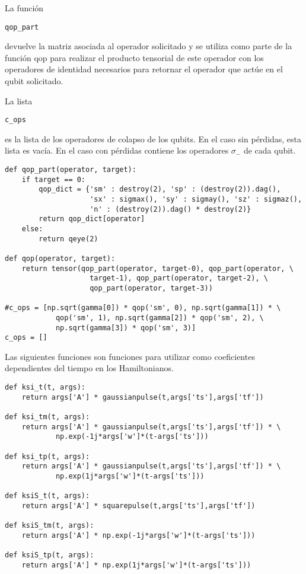 La función \begin{verbatim}qop_part\end{verbatim} devuelve la matriz asociada al operador solicitado y se utiliza como parte de la función qop para realizar el producto tensorial de este operador con los operadores de identidad necesarios para retornar el operador que actúe en el qubit solicitado.

La lista \begin{verbatim}c_ops\end{verbatim} es la lista de los operadores de colapso de los qubits. En el caso sin pérdidas, esta lista es vacía. En el caso con pérdidas contiene los operadores $\sigma_-$ de cada qubit.

\begin{verbatim}
def qop_part(operator, target):
    if target == 0:
        qop_dict = {'sm' : destroy(2), 'sp' : (destroy(2)).dag(), 
                    'sx' : sigmax(), 'sy' : sigmay(), 'sz' : sigmaz(),
                    'n' : (destroy(2)).dag() * destroy(2)}
        return qop_dict[operator]
    else:
        return qeye(2)

def qop(operator, target):
    return tensor(qop_part(operator, target-0), qop_part(operator, \
                    target-1), qop_part(operator, target-2), \
                    qop_part(operator, target-3))
    
#c_ops = [np.sqrt(gamma[0]) * qop('sm', 0), np.sqrt(gamma[1]) * \
            qop('sm', 1), np.sqrt(gamma[2]) * qop('sm', 2), \
            np.sqrt(gamma[3]) * qop('sm', 3)]
c_ops = []
\end{verbatim}

Las siguientes funciones son funciones para utilizar como coeficientes dependientes del tiempo en los Hamiltonianos.

\begin{verbatim}
def ksi_t(t, args):
    return args['A'] * gaussianpulse(t,args['ts'],args['tf'])

def ksi_tm(t, args):
    return args['A'] * gaussianpulse(t,args['ts'],args['tf']) * \
            np.exp(-1j*args['w']*(t-args['ts']))

def ksi_tp(t, args):
    return args['A'] * gaussianpulse(t,args['ts'],args['tf']) * \
            np.exp(1j*args['w']*(t-args['ts']))

def ksiS_t(t, args):
    return args['A'] * squarepulse(t,args['ts'],args['tf'])

def ksiS_tm(t, args):
    return args['A'] * np.exp(-1j*args['w']*(t-args['ts']))

def ksiS_tp(t, args):
    return args['A'] * np.exp(1j*args['w']*(t-args['ts']))
\end{verbatim}

